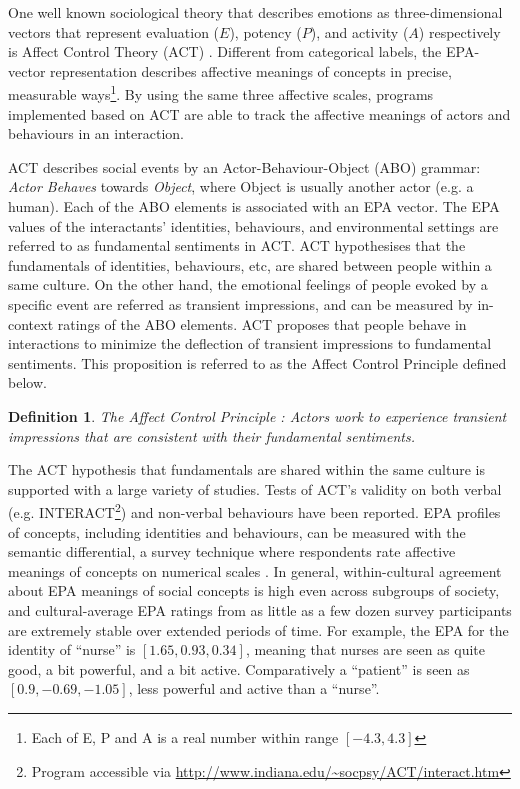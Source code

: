 One well known sociological theory that describes emotions as three-dimensional vectors that represent evaluation ($E$), potency ($P$), and activity ($A$) respectively is Affect Control Theory (ACT) \cite{robinson2006affect}. Different from categorical labels, the EPA-vector representation describes affective meanings of concepts in precise, measurable ways\footnote{Each of E, P and A is a real number within range $[-4.3, 4.3]$}. By using the same three affective scales, programs implemented based on ACT are able to track the affective meanings of actors and behaviours in an interaction.

ACT describes social events by an Actor-Behaviour-Object (ABO) grammar: \textit{Actor Behaves} towards \textit{Object}, where Object is usually another actor (e.g. a human). Each of the ABO elements is associated with an EPA vector. The EPA values of the interactants' identities, behaviours, and environmental settings are referred to as fundamental sentiments in ACT. ACT hypothesises that the fundamentals of identities, behaviours, etc, are shared between people within a same culture. On the other hand, the emotional feelings of people evoked by a specific event are referred as transient impressions, and can be measured by in-context ratings of the ABO elements. ACT proposes that people behave in interactions to minimize the deflection of transient impressions to fundamental sentiments. This proposition is referred to as the Affect Control Principle defined below.

\newtheorem{def-act}{Definition}
\begin{def-act}
\label{def:act}
The Affect Control Principle \cite{robinson2006affect}: Actors work to experience transient impressions that are consistent with their fundamental sentiments.
\end{def-act}

The ACT hypothesis that fundamentals are shared within the same culture is supported with a large variety of studies. Tests of ACT's validity on both verbal (e.g. INTERACT\footnote{Program accessible via \url{http://www.indiana.edu/~socpsy/ACT/interact.htm}}) and non-verbal behaviours \cite{schroder2013culture} have been reported. EPA profiles of concepts, including identities and behaviours, can be measured with the semantic differential, a survey technique where respondents rate affective meanings of concepts on numerical scales \cite{osgood1975cross}. In general, within-cultural agreement about EPA meanings of social concepts is high even across subgroups of society, and cultural-average EPA ratings from as little as a few dozen survey participants are extremely stable over extended periods of time. For example, the EPA for the identity of ``nurse'' is $[1.65, 0.93, 0.34]$, meaning that nurses are seen as quite good, a bit powerful, and a bit active. Comparatively a ``patient'' is seen as $[0.9, -0.69, -1.05]$, less powerful and active than a ``nurse''.

